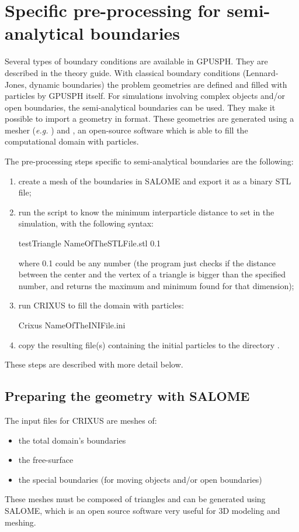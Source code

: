 \documentclass{../GPUSPHtemplate}
\begin{document}
\section{Specific pre-processing for semi-analytical boundaries}\label{sec:preprocess_sa}

Several types of boundary conditions are available in GPUSPH. 
They are described in the theory guide.
With classical boundary conditions (Lennard-Jones, dynamic boundaries) the problem 
geometries are defined and filled with particles by GPUSPH itself.
For simulations involving complex objects and/or open boundaries, 
the semi-analytical boundaries can be used. They make it possible 
to import a geometry in  format. These geometries are 
generated using a mesher (\textit{e.g.} ) and ,
an open-source software which is able to fill the computational 
domain with particles. 

The pre-processing steps specific to semi-analytical boundaries 
are the following:
\begin{enumerate}
\item create a mesh of the boundaries in SALOME and 
export it as a binary STL file;
\item run the  script to know the 
minimum interparticle distance to set in the simulation, 
with the following syntax:
\begin{shellcode}
testTriangle NameOfTheSTLFile.stl 0.1
\end{shellcode}
where 0.1 could be any number (the program just checks if 
the distance between the center and the vertex of a 
triangle is bigger than the specified number, and returns 
the maximum and minimum found for that dimension);
\item run CRIXUS to fill the domain with particles:
\begin{shellcode}
Crixus NameOfTheINIFile.ini
\end{shellcode}
\item copy the resulting  file(s) containing 
the initial particles to the directory .
\end{enumerate}

These steps are described with more detail below.

\subsection{Preparing the geometry with SALOME}

The input files for CRIXUS are meshes of:
\begin{itemize}
\item the total domain's boundaries
\item the free-surface
\item the special boundaries (for moving objects 
and/or open boundaries)
\end{itemize}
These meshes must be composed of triangles and can 
be generated using SALOME, which is an open source 
software very useful for 3D modeling and meshing.\\
\end{document}
